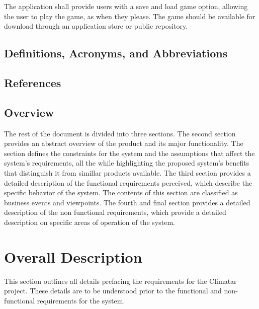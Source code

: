 \documentclass[]{article}
\begin{document}
	The application shall provide users with a save and load game option, allowing the user to play the game, as when they please. The game should be available for download through an application store or public repository.	

\subsection{Definitions, Acronyms, and Abbreviations}
\label{sub:definitions_acronyms_and_abbreviations}


\subsection{References}
\label{sub:references}



\subsection{Overview}
\label{sub:overview}
	The rest of the document is divided into three sections. The second section provides an abstract overview of the product and its major functionality. The section defines the constraints for the system and the assumptions that affect the system’s requirements, all the while highlighting the proposed system's benefits that distinguish it from simillar products available. The third section provides a detailed description of the functional requirements perceived, which describe the specific behavior of the system. The contents of this section are classified as business events and viewpoints. The fourth and final section provides a detailed description of the non functional requirements, which provide a detailed description on specific areas of operation of the system.  



\section{Overall Description}
\label{sec:overall_description}

This section outlines all details prefacing the requirements for the Climatar project. These details are to be understood prior to the functional and non-functional requirements for the system.
\end{document}

